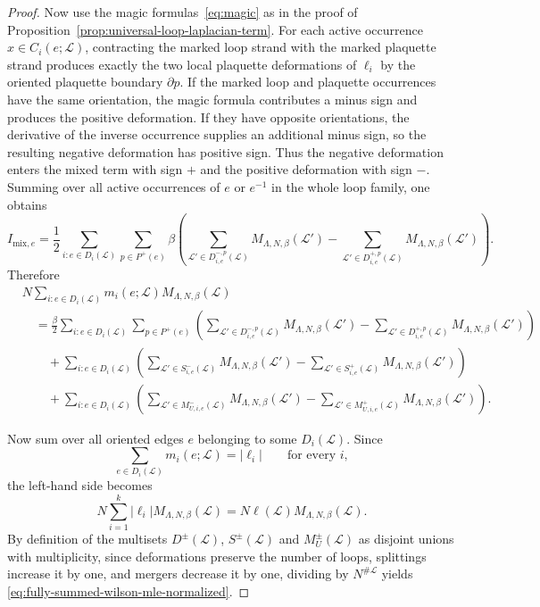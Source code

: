 \documentclass[11pt,a4paper,reqno]{article}
\theoremstyle{definition}
\theoremstyle{remark}
\newcommand\Lc{{\mathcal{L}}}
\begin{document}
\begin{proof}
Now use the magic formulas~\eqref{eq:magic} as in the proof of Proposition~\ref{prop:universal-loop-laplacian-term}. For each active occurrence $x\in C_i(e;\Lc)$, contracting the marked loop strand with the marked plaquette strand produces exactly the two local plaquette deformations of $\ell_i$ by the oriented plaquette boundary $\partial p$.  If the marked loop and plaquette occurrences have the same orientation, the magic formula contributes a minus sign and produces the positive deformation.  If they have opposite orientations, the derivative of the inverse occurrence supplies an additional minus sign, so the resulting negative deformation has positive sign.  Thus the negative deformation enters the mixed term with sign $+$ and the positive deformation with sign $-$. Summing over all active occurrences of $e$ or $e^{-1}$ in the whole loop family, one obtains
\[
I_{\mathrm{mix},e}=\frac12\sum_{i:e\in D_i(\Lc)}\sum_{p\in P^+(e)}\beta\left(\sum_{\Lc'\in D^{-,p}_{i,e}(\Lc)} M_{\Lambda,N,\beta}(\Lc')-\sum_{\Lc'\in D^{+,p}_{i,e}(\Lc)} M_{\Lambda,N,\beta}(\Lc')\right).
\]
Therefore
\begin{align*}
&N\sum_{i:e\in D_i(\Lc)}m_i(e;\Lc)M_{\Lambda,N,\beta}(\Lc)\\
&\quad=\frac{\beta}{2}\sum_{i:e\in D_i(\Lc)}\sum_{p\in P^+(e)}
\left(
\sum_{\Lc'\in D^{-,p}_{i,e}(\Lc)}M_{\Lambda,N,\beta}(\Lc')
-
\sum_{\Lc'\in D^{+,p}_{i,e}(\Lc)}M_{\Lambda,N,\beta}(\Lc')
\right)\\
&\qquad+
\sum_{i:e\in D_i(\Lc)}
\left(
\sum_{\Lc'\in S^-_{i,e}(\Lc)}M_{\Lambda,N,\beta}(\Lc')
-
\sum_{\Lc'\in S^+_{i,e}(\Lc)}M_{\Lambda,N,\beta}(\Lc')
\right)\\
&\qquad+
\sum_{i:e\in D_i(\Lc)}
\left(
\sum_{\Lc'\in M^-_{U,i,e}(\Lc)}M_{\Lambda,N,\beta}(\Lc')
-
\sum_{\Lc'\in M^+_{U,i,e}(\Lc)}M_{\Lambda,N,\beta}(\Lc')
\right).
\end{align*}

Now sum over all oriented edges $e$ belonging to some $D_i(\Lc)$. Since
\[
\sum_{e\in D_i(\Lc)} m_i(e;\Lc)=|\ell_i|\qquad\text{for every }i,
\]
the left-hand side becomes
\[
N\sum_{i=1}^k |\ell_i|M_{\Lambda,N,\beta}(\Lc)=N\ell(\Lc)M_{\Lambda,N,\beta}(\Lc).
\]
By definition of the multisets $D^\pm(\Lc)$, $S^\pm(\Lc)$ and $M_U^\pm(\Lc)$ as disjoint unions with multiplicity, since deformations preserve the number of loops, splittings increase it by one, and mergers decrease it by one, dividing by \(N^{\#\Lc}\) yields \eqref{eq:fully-summed-wilson-mle-normalized}.
\end{proof}
\end{document}
